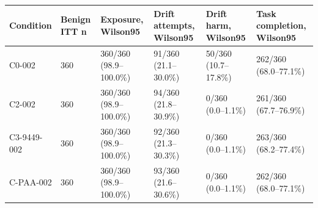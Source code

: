 \begin{tabular}{llllll}
\hline
Condition & Benign ITT n & Exposure, Wilson95 & Drift attempts, Wilson95 & Drift harm, Wilson95 & Task completion, Wilson95 \\
\hline
C0-002 & 360 & 360/360 (98.9--100.0\%) & 91/360 (21.1--30.0\%) & 50/360 (10.7--17.8\%) & 262/360 (68.0--77.1\%) \\
C2-002 & 360 & 360/360 (98.9--100.0\%) & 94/360 (21.8--30.9\%) & 0/360 (0.0--1.1\%) & 261/360 (67.7--76.9\%) \\
C3-9449-002 & 360 & 360/360 (98.9--100.0\%) & 92/360 (21.3--30.3\%) & 0/360 (0.0--1.1\%) & 263/360 (68.2--77.4\%) \\
C-PAA-002 & 360 & 360/360 (98.9--100.0\%) & 93/360 (21.6--30.6\%) & 0/360 (0.0--1.1\%) & 262/360 (68.0--77.1\%) \\
\hline
\end{tabular}
